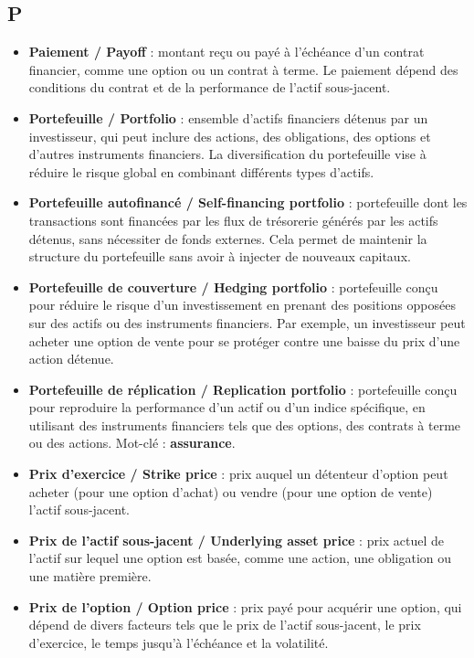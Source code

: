 \documentclass[a4paper,10pt]{article}
\begin{document}
\begin{multicols}{2}
\section*{P}
\begin{itemize}
  \item \textbf{Paiement / Payoff} : montant reçu ou payé à l’échéance d’un contrat financier, comme une option ou un contrat à terme. Le paiement dépend des conditions du contrat et de la performance de l’actif sous-jacent.
  \item \textbf{Portefeuille / Portfolio} : ensemble d’actifs financiers détenus par un investisseur, qui peut inclure des actions, des obligations, des options et d’autres instruments financiers. La diversification du portefeuille vise à réduire le risque global en combinant différents types d’actifs.
  \item \textbf{Portefeuille autofinancé / Self-financing portfolio} : portefeuille dont les transactions sont financées par les flux de trésorerie générés par les actifs détenus, sans nécessiter de fonds externes. Cela permet de maintenir la structure du portefeuille sans avoir à injecter de nouveaux capitaux.
  \item \textbf{Portefeuille de couverture / Hedging portfolio} : portefeuille conçu pour réduire le risque d’un investissement en prenant des positions opposées sur des actifs ou des instruments financiers. Par exemple, un investisseur peut acheter une option de vente pour se protéger contre une baisse du prix d’une action détenue.
  \item \textbf{Portefeuille de réplication / Replication portfolio} : portefeuille conçu pour reproduire la performance d’un actif ou d’un indice spécifique, en utilisant des instruments financiers tels que des options, des contrats à terme ou des actions. Mot-clé : \textbf{assurance}.
  \item \textbf{Prix d’exercice / Strike price} : prix auquel un détenteur d’option peut acheter (pour une option d’achat) ou vendre (pour une option de vente) l’actif sous-jacent.
  \item \textbf{Prix de l’actif sous-jacent / Underlying asset price} : prix actuel de l’actif sur lequel une option est basée, comme une action, une obligation ou une matière première.
  \item \textbf{Prix de l’option / Option price} : prix payé pour acquérir une option, qui dépend de divers facteurs tels que le prix de l’actif sous-jacent, le prix d’exercice, le temps jusqu’à l’échéance et la volatilité.

\end{itemize}
\end{multicols}
\end{document}

